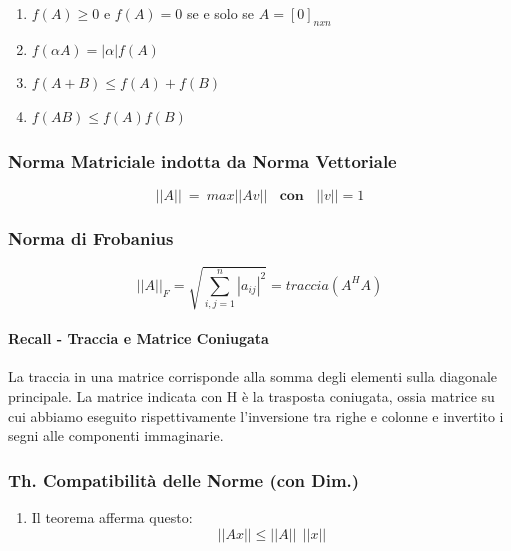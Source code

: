 \documentclass{article}
\begin{document}
\begin{enumerate}
    \item $f(A) \geq 0$ e $f(A) = 0$ se e solo se $A = [0]_{nxn}$
    \item $f(\alpha A) = |\alpha|f(A)$
    \item $f(A+B) \leq f(A) + f(B)$
    \item $f(AB) \leq f(A)f(B)$
\end{enumerate}

\subsubsection{Norma Matriciale indotta da Norma Vettoriale}

\vspace*{10px}

\[ \boxed{||A|| \: = \: max||Av|| \: \: \: \: \textbf{con} \: \: \: \: ||v|| = 1} \] 

\vspace*{10px}

\subsubsection{Norma di Frobanius}

\vspace*{10px}

\[ \boxed{||A||_{F} = \sqrt{\sum^{n}_{i,j=1}|a_{ij}|^2} = traccia(A^{H}A)} \]

\vspace*{20px}

\paragraph{Recall - Traccia e Matrice Coniugata} La traccia in una matrice corrisponde alla somma degli elementi sulla diagonale principale. La matrice indicata con H è la trasposta coniugata, ossia matrice su cui abbiamo eseguito rispettivamente l'inversione tra righe e colonne e invertito i segni alle componenti immaginarie.

\newpage

\subsubsection{Th. Compatibilità delle Norme (con Dim.)}

\begin{enumerate}
    \item Il teorema afferma questo:
    \vspace*{10px}
    \[ \boxed{||Ax|| \leq ||A||\:\:||x||} \]
\end{enumerate}
\end{document}
